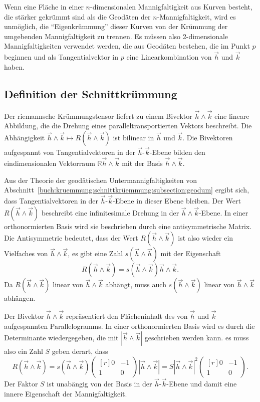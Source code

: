 Wenn eine Fläche in einer $n$-dimensionalen Mannigfaltigkeit aus
Kurven besteht, die stärker gekrümmt sind als die Geodäten 
der $n$-Mannigfaltigkeit, wird es unmöglich, die ``Eigenkrümmung''
dieser Kurven von der Krümmung der umgebenden Mannigfaltigkeit
zu trennen.
Es müssen also 2-dimensionale Mannigfaltigkeiten verwendet werden, 
die aus Geodäten bestehen, die im Punkt $p$ beginnen und als
Tangentialvektor in $p$ eine Linearkombination von $\vec{h}$ und
$\vec{k}$ haben.



%
%
\subsection{Definition der Schnittkrümmung}
Der riemannsche Krümmungstensor liefert zu einem Bivektor
$\vec{h}\wedge\vec{k}$ eine lineare Abbildung, die die Drehung
eines paralleltransportierten Vektors beschreibt.
Die Abhängigkeit $\vec{h}\wedge\vec{k}\mapsto R(\vec{h}\wedge\vec{k})$
ist bilinear in $\vec{h}$ und $\vec{k}$.
Die Bivektoren aufgespannt von Tangentialvektoren in der
$\vec{h}$-$\vec{k}$-Ebene bilden den eindimensionalen Vektorraum
$\mathbb{R}\vec{h}\wedge\vec{k}$ mit der Basis $\vec{h}\wedge\vec{k}$.

Aus der Theorie der geodätischen Untermannigfaltigkeiten von
Abschnitt~\ref{buch:kruemmung:schnittkrüemmung:subsection:geodum}
ergibt sich, dass Tangentialvektoren in der $\vec{h}$-$\vec{k}$-Ebene
in dieser Ebene bleiben.
Der Wert $R(\vec{h}\wedge\vec{k})$ beschreibt eine infinitesimale Drehung
in der $\vec{h}\wedge\vec{k}$-Ebene.
In einer orthonormierten Basis wird sie beschrieben durch eine
antisymmetrische Matrix.
Die Antisymmetrie bedeutet, dass der Wert $R(\vec{h}\wedge\vec{k})$ ist
also wieder ein Vielfaches von $\vec{h}\wedge\vec{k}$, es gibt
eine Zahl $s(\vec{h}\wedge\vec{h})$ mit der Eigenschaft
\[
R(\vec{h}\wedge\vec{k})
=
s(\vec{h}\wedge\vec{k})
\vec{h}\wedge\vec{k}.
\]
Da $R(\vec{h}\wedge\vec{k})$ linear von $\vec{h}\wedge\vec{k}$ abhängt,
muss auch $s(\vec{h}\wedge\vec{k})$ linear von $\vec{h}\wedge\vec{k}$
abhängen.

Der Bivektor $\vec{h}\wedge\vec{k}$ repräsentiert den Flächeninhalt
des von $\vec{h}$ und $\vec{k}$ aufgespannten Parallelogramms. 
In einer orthonormierten Basis wird es durch die Determinante wiedergegeben,
die mit $|\vec{h}\wedge\vec{k}|$ geschrieben werden kann.
es muss also ein Zahl $S$ geben derart, dass
\[
R(\vec{h}\wedge\vec{k})
=
s(\vec{h}\wedge\vec{k})
\begin{pmatrix*}[r] 0&-1\\ 1&0\end{pmatrix*}
|\vec{h}\wedge\vec{k}|
=
S |\vec{h}\wedge\vec{k}|^2
\begin{pmatrix*}[r] 0&-1\\1&0\end{pmatrix*}.
\]
Der Faktor $S$ ist unabängig von der Basis in der $\vec{h}$-$\vec{k}$-Ebene
und damit eine innere Eigenschaft der Mannigfaltigkeit.

